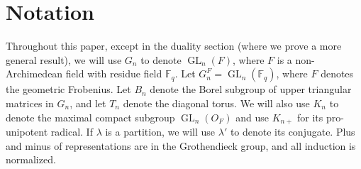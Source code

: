 \documentclass[12pt]{article}
\theoremstyle{remark}
\begin{document}
\section{Notation}
Throughout this paper, except in the duality section (where we prove a more general result), we will use $G_n$ to denote $\operatorname{GL}_n(F)$, where $F$ is a non-Archimedean field with residue field $\mathbb{F}_q$. Let $G^F_n = \operatorname{GL}_n(\mathbb{F}_q)$, where $F$ denotes the geometric Frobenius. Let $B_n$ denote the Borel subgroup of upper triangular matrices in $G_n$, and let $T_n$ denote the diagonal torus. We will also use $K_n$ to denote the maximal compact subgroup $\operatorname{GL}_n(O_F)$ and use $K_{n+}$ for its pro-unipotent radical. If $\lambda$ is a partition, we will use $\lambda'$ to denote its conjugate. Plus and minus of representations are in the Grothendieck group, and all induction is normalized.
\end{document}
